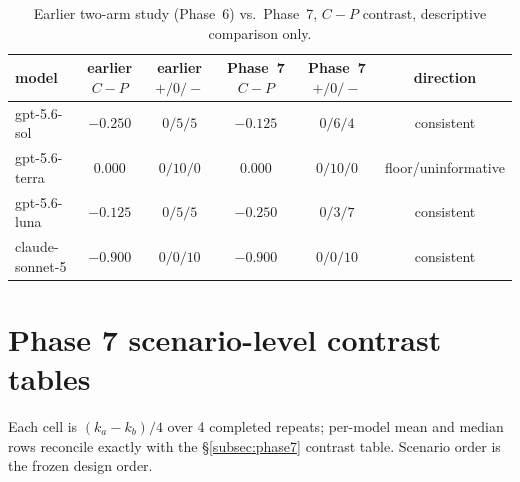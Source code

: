\documentclass[10pt]{article}
\begin{document}
\begin{table}[t]
\centering
\caption{Earlier two-arm study (Phase~6) vs.\ Phase~7, \mbox{$C - P$}
contrast, descriptive comparison only.}
\label{tab:xphase}
\small
\begin{tabular}{@{}lccccc@{}}
\toprule
model & earlier \mbox{$C - P$} & earlier $+/0/-$ & Phase~7 \mbox{$C - P$} & Phase~7 $+/0/-$ & direction \\
\midrule
gpt-5.6-sol     & $-0.250$ & $0 / 5 / 5$  & $-0.125$ & $0 / 6 / 4$  & consistent \\
gpt-5.6-terra   & $0.000$  & $0 / 10 / 0$ & $0.000$  & $0 / 10 / 0$ & floor/uninformative \\
gpt-5.6-luna    & $-0.125$ & $0 / 5 / 5$  & $-0.250$ & $0 / 3 / 7$  & consistent \\
claude-sonnet-5 & $-0.900$ & $0 / 0 / 10$ & $-0.900$ & $0 / 0 / 10$ & consistent \\
\bottomrule
\end{tabular}
\end{table}

\section{Phase 7 scenario-level contrast tables}
\label{app:scenario}

Each cell is $(k_a - k_b) / 4$ over 4 completed repeats; per-model mean
and median rows reconcile exactly with the \S\ref{subsec:phase7} contrast
table. Scenario order is the frozen design order.
\end{document}
